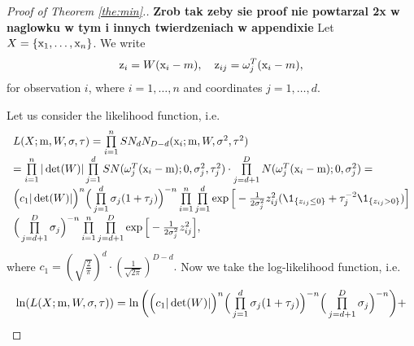 \begin{proof}[Proof of Theorem \ref{the:min}.]
\textbf{Zrob tak zeby sie proof nie powtarzal 2x w naglowku w tym i innych twierdzeniach w appendixie}
Let $X=\{ \mathrm{x}_1, \ldots, \mathrm{x}_n \}$.
We write 
\begin{equation*}
\mathrm{z}_i= W(\mathrm{x}_i-m), \quad \mathrm{z}_{ij}= \omega_j^T(\mathrm{x}_i-m),
\end{equation*}
for observation $i$, where $i=1,\ldots,n$ and coordinates $j=1,\ldots,d$.

Let us consider the likelihood function, i.e. 
$$
\begin{array}{l}
L(X;\m,W,\sigma,\tau) = \prod\limits_{i=1}^{n} SN_{d}N_{D-d}(\x_i; \m,W, \sigma^2,\tau^2) \\[6pt] 
=\prod\limits_{i=1}^{n} | \det(W)|  \prod\limits_{j=1}^{d} SN(  \w_j^T (\x_i - \m) ; 0 , \sigma_j^2, \tau_j^2) \cdot %
\prod\limits_{j=d+1}^{D} N(  \w_j^T (\x_i - \m) ; 0 , \sigma_j^2) =\\[6pt]
\Big( c_1|\det(W)| \Big)^{n} 
\Big( \prod\limits_{j=1}^{d} \sigma_j(1+\tau_j) \Big)^{-n} %
\prod\limits_{i=1}^{n} %
\prod\limits_{j=1}^{d} \exp \Big[ -\frac{1}{2\sigma_j^2}z_{ij}^2 (\1_{ \{ z_{ij} \leq 0 \} } + %
\tau_{j}^{-2} \1_{ \{ z_{ij} > 0 \} }) \Big] \\[6pt]
\Big( \prod\limits_{j=d+1}^{D} \sigma_j \Big)^{-n} \prod\limits_{i=1}^{n}\prod\limits_{j=d+1}^{D} \exp \Big[ -\frac{1}{2\sigma_j^2}z_{ij}^2 \Big],
\end{array}
$$
where 
$
c_1= \left( \sqrt{\tfrac{2}{\pi}} \right)^{d} \cdot \left( \tfrac{1}{ \sqrt{2\pi} } \right)^{D-d}.
$
Now we take the log-likelihood function, i.e. 
$$
\begin{array}{l}
\ln(L(X;\m,W,\sigma,\tau)) = \ln \bigg( \Big( c_1|\det(W)| \Big)^{n} \Big( \prod\limits_{j=1}^{d} \sigma_j(1+\tau_j) \Big)^{-n} \Big( \prod\limits_{j=d+1}^{D} \sigma_j \Big)^{-n}  \bigg) + \\[6pt]

\end{array}$$
\end{proof}
